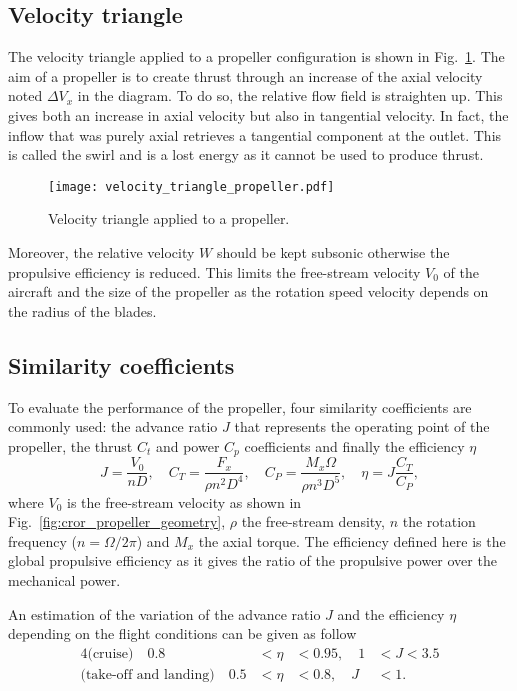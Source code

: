 \subsection{Velocity triangle}
\label{sub:cror_propeller_velocity_triangle}
The velocity triangle applied to a propeller configuration
is shown in Fig.~\ref{fig:cror_velocity_triangle_propeller}.
The aim of a propeller is to create thrust through an increase
of the axial velocity noted $\Delta V_x$ in the diagram. To do
so, the relative flow field is straighten up. This gives both
an increase in axial velocity but also in tangential velocity.
In fact, the inflow that was purely axial retrieves a tangential
component at the outlet. This is called the swirl and
is a lost energy as it cannot be used to produce thrust.
\begin{figure}[htp]
  \centering
  \texttt{[image: velocity\_triangle\_propeller.pdf]}
  \caption{Velocity triangle applied to a propeller.}
  \label{fig:cror_velocity_triangle_propeller}
\end{figure}
Moreover, the relative velocity $W$ should be kept subsonic
otherwise the propulsive efficiency is reduced. This limits
the free-stream velocity $V_0$ of the aircraft and the size of 
the propeller as the rotation speed velocity depends on
the radius of the blades.

\subsection{Similarity coefficients}
\label{sub:similarity_coefficients}
To evaluate the performance of the propeller, four similarity
coefficients are commonly used:
the advance ratio $J$ that represents the operating point of the propeller,
the thrust $C_t$ and power $C_p$ coefficients and finally
the efficiency $\eta$
\begin{equation}
    J = \frac{V_0}{n D}, \quad
    C_T = \frac{F_x}{\rho n ^ 2  D ^ 4}, \quad
    C_P = \frac{M_x \Omega}{\rho n ^ 3 D ^ 5}, \quad
    \eta = J \frac{C_T}{C_P},
\end{equation}
where $V_0$ is the free-stream velocity 
as shown in Fig.~\ref{fig:cror_propeller_geometry},
$\rho$ the free-stream density,
$n$ the rotation frequency ($n = \Omega / 2 \pi$) and
$M_x$ the axial torque.
The efficiency defined here is the global propulsive efficiency
as it gives the ratio of the propulsive power over the mechanical power.

An estimation of the variation of the advance ratio $J$ and the 
efficiency $\eta$ depending on the flight conditions can be given as follow~\cite{Bousquet2012}
\begin{alignat}{4}
    \text{(cruise)} \quad  0.8 &< \eta &< 0.95, \quad 1 &< J < 3.5 \\
    \text{(take-off and landing)} \quad  0.5 &< \eta &< 0.8, \quad J &< 1.
    \label{eq:estimation_sim_coeff}
\end{alignat}

